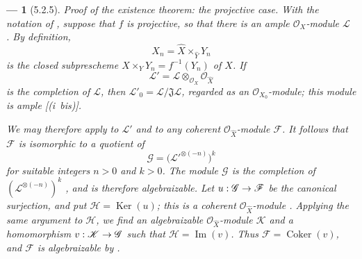 \documentclass[oneside]{amsart}
\theoremstyle{ega-env-style}
\newtheorem*{env}{---}
\theoremstyle{ega-thm-env-style}
\theoremstyle{ega-defn-env-style}
\def\mathcal{\mathscr}
\def\sh{\mathcal}                   %
\def\Ker{\operatorname{Ker}}
\def\Im{\operatorname{Im}}
\def\Coker{\operatorname{Coker}}
\renewcommand{\to}{\mathchoice{\longrightarrow}{\rightarrow}{\rightarrow}{\rightarrow}}
\let\EGAOriginalLabel\label
\renewcommand{\label}[1]{\phantomsection\EGAOriginalLabel{#1}}
\begin{document}
\begin{env}[5.2.5]
\label{III.5.2.5}
\emph{Proof of the existence theorem: the projective case.}
With the notation of , suppose that $f$ is
projective, so that there is an ample $\sh{O}_X$-module $\sh{L}$
.  By definition,
\[
  X_n=\widehat{X}\times_{\widehat{Y}}Y_n
\]
is the closed subprescheme
$X\times_Y Y_n=f^{-1}(Y_n)$ of $X$.  If
\[
  \sh{L}'=\sh{L}\otimes_{\sh{O}_X}\sh{O}_{\widehat{X}}
\]
is the completion of $\sh{L}$, then
$\sh{L}'_0=\sh{L}/\mathfrak{J}\sh{L}$, regarded as an
$\sh{O}_{X_0}$-module; this module is ample
[(i~\emph{bis})].

We may therefore apply  to $\sh{L}'$ and to any
coherent $\sh{O}_{\widehat{X}}$-module $\sh{F}$.  It follows that
$\sh{F}$ is isomorphic to a quotient of
\[
  \sh{G}=
  \bigl(\sh{L}'^{\otimes(-n)}\bigr)^k
\]
for suitable integers $n>0$ and $k>0$.  The module $\sh{G}$ is the
completion of $(\sh{L}^{\otimes(-n)})^k$
, and is therefore algebraizable.  Let
$u:\sh{G}\to\sh{F}$ be the canonical surjection, and put
$\sh{H}=\Ker(u)$; this is a coherent
$\sh{O}_{\widehat{X}}$-module .  Applying the same
argument to $\sh{H}$, we find an algebraizable
$\sh{O}_{\widehat{X}}$-module $\sh{K}$ and a homomorphism
$v:\sh{K}\to\sh{G}$ such that $\sh{H}=\Im(v)$.  Thus
$\sh{F}=\Coker(v)$, and $\sh{F}$ is algebraizable by
.
\end{env}
\end{document}
